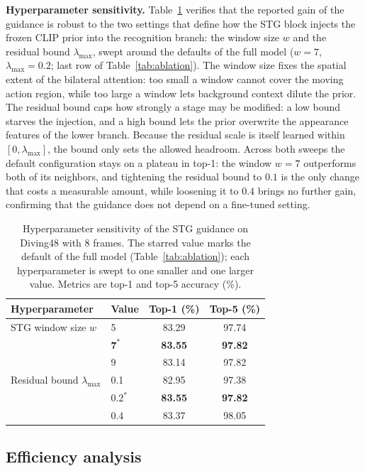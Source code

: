 \textbf{Hyperparameter sensitivity.}
Table~\ref{tab:hyper} verifies that the reported gain of the guidance is
robust to the two settings that define how the STG block injects the frozen
CLIP prior into the recognition branch: the window size $w$ and the residual
bound $\lambda_{\max}$, swept around the defaults of the full model
($w{=}7$, $\lambda_{\max}{=}0.2$; last row of Table~\ref{tab:ablation}).
The window size fixes the spatial extent of the bilateral attention: too
small a window cannot cover the moving action region, while too large a
window lets background context dilute the prior. The residual bound caps how
strongly a stage may be modified: a low bound starves the injection, and a
high bound lets the prior overwrite the appearance features of the lower
branch. Because the residual scale is itself learned within
$[0,\lambda_{\max}]$, the bound only sets the allowed headroom. Across both
sweeps the default configuration stays on a plateau in top-1: the window
$w{=}7$ outperforms both of its neighbors, and tightening the residual bound
to $0.1$ is the only change that costs a measurable amount, while loosening
it to $0.4$ brings no further gain, confirming that the guidance does not
depend on a fine-tuned setting.

\begin{table}[t]
  \centering
  \caption{Hyperparameter sensitivity of the STG guidance on Diving48 with
  $8$ frames. The starred value marks the default of the full model
  (Table~\ref{tab:ablation}); each hyperparameter is swept to one smaller
  and one larger value. Metrics are top-1 and top-5 accuracy (\%).}
  \label{tab:hyper}
  \small
  \begin{tabular}{llcc}
    \toprule
    Hyperparameter & Value & Top-1 (\%) & Top-5 (\%) \\
    \midrule
    STG window size $w$ & 5 & 83.29 & 97.74 \\
     & $\mathbf{7}^{\ast}$ & \textbf{83.55} & \textbf{97.82} \\
     & 9 & 83.14 & 97.82 \\
    \midrule
    Residual bound $\lambda_{\max}$ & 0.1 & 82.95 & 97.38 \\
     & $\mathbf{0.2}^{\ast}$ & \textbf{83.55} & \textbf{97.82} \\
     & 0.4 & 83.37 & 98.05 \\
    \bottomrule
  \end{tabular}
\end{table}

\subsection{Efficiency analysis}
\label{sec:efficiency}

